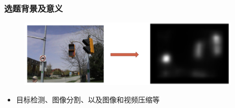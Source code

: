 \documentclass[notheorems,mathserif,table,compress]{beamer}  %
\begin{document}
\begin{frame}
  \frametitle{选题背景及意义}
\begin{figure}[!htb] %
\centering
\includegraphics[width=0.95\textwidth]{视觉注意1.png}
\label{fig:2}
\end{figure}
  \begin{itemize}
  \item 目标检测、图像分割、以及图像和视频压缩等
  \end{itemize}
\end{frame}

\end{document}
